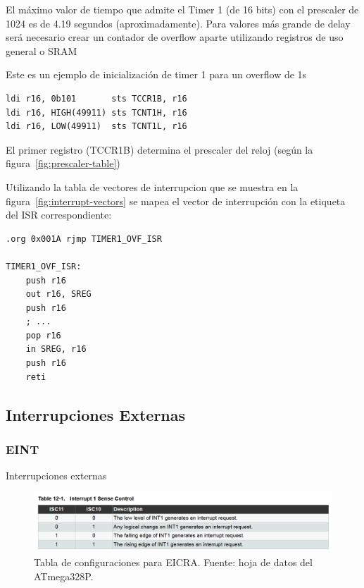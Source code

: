 El máximo valor de tiempo que admite el Timer 1 (de 16 bits) con el prescaler de 1024 es de 4.19 segundos (aproximadamente). Para valores más grande de delay será necesario crear un contador de overflow aparte utilizando registros de uso general o SRAM

Este es un ejemplo de inicialización de timer 1 para un overflow de 1s

\begin{verbatim}
ldi r16, 0b101       sts TCCR1B, r16
ldi r16, HIGH(49911) sts TCNT1H, r16
ldi r16, LOW(49911)  sts TCNT1L, r16 
\end{verbatim}

El primer registro (TCCR1B) determina el prescaler del reloj (según la figura\ \ref{fig:prescaler-table})

Utilizando la tabla de vectores de interrupcion que se muestra en la figura\ \ref{fig:interrupt-vectors} se mapea el vector de interrupción con la etiqueta del ISR correspondiente:

\begin{verbatim}
.org 0x001A rjmp TIMER1_OVF_ISR

TIMER1_OVF_ISR:
    push r16
    out r16, SREG
    push r16
    ; ... 
    pop r16
    in SREG, r16
    push r16
    reti
\end{verbatim}

\subsection{Interrupciones Externas}\label{anexo:Interrupciones_Externas}
   \subsubsection{EINT}
    Interrupciones externas 

    \begin{figure}[H]
    \centering
    \includegraphics[width=\linewidth]{./Anexos/Marco Teorico/External Interrupts/EICRA table.png}
    \caption{Tabla de configuraciones para EICRA. Fuente: hoja de datos del ATmega328P\@\cite{atmega328p_datasheet}.}
    \label{fig:EICRA-table}
    \end{figure}

